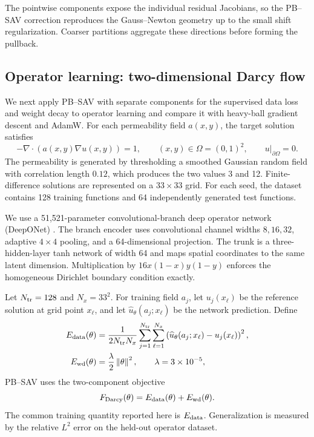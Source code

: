 The pointwise components expose the individual residual Jacobians, so the
PB--SAV correction reproduces the Gauss--Newton geometry up to the small shift
regularization. Coarser partitions aggregate these directions before forming
the pullback.

\subsection{Operator learning: two-dimensional Darcy flow}
\label{sec:darcy-experiment}

We next apply PB--SAV with separate components for the supervised data loss
and weight decay to operator learning and compare it with heavy-ball gradient descent and
AdamW. For each
permeability field \(a(x,y)\), the target solution satisfies
\begin{equation}
  -\nabla\!\cdot\!\left(a(x,y)\nabla u(x,y)\right)=1,
  \qquad (x,y)\in\Omega=(0,1)^2,
  \qquad u|_{\partial\Omega}=0.
  \label{eq:darcy-problem}
\end{equation}
The permeability is generated by thresholding a smoothed Gaussian random
field with correlation length \(0.12\), which produces the two values 3 and
12.  Finite-difference solutions are represented on a \(33\times33\) grid.
For each seed, the dataset contains 128 training functions and 64 independently
generated test functions.

We use a 51,521-parameter convolutional-branch deep operator network
(DeepONet) \cite{lu2021deeponet}. The branch encoder uses convolutional channel widths
\(8,16,32\), adaptive \(4\times4\) pooling, and a 64-dimensional projection.
The trunk is a three-hidden-layer tanh network of width 64 and maps spatial
coordinates to the same latent dimension.  Multiplication by
\(16x(1-x)y(1-y)\) enforces the homogeneous Dirichlet boundary condition exactly.

Let \(N_{\rm tr}=128\) and \(N_x=33^2\).  For training field \(a_j\), let
\(u_j(x_\ell)\) be the reference solution at grid point \(x_\ell\), and let
\(\widehat u_\theta(a_j;x_\ell)\) be the network prediction.  Define
\begin{align}
  E_{\rm data}(\theta)
  &=\frac{1}{2N_{\rm tr}N_x}
    \sum_{j=1}^{N_{\rm tr}}
    \sum_{\ell=1}^{N_x}
    \left(\widehat u_\theta(a_j;x_\ell)-u_j(x_\ell)\right)^2,\\
  E_{\rm wd}(\theta)
  &=\frac{\lambda}{2}\left\lVert\theta\right\rVert^2,
  \qquad \lambda=3\times10^{-5},
\end{align}
PB--SAV uses the two-component objective
\begin{equation}
  F_{\rm Darcy}(\theta)=E_{\rm data}(\theta)+E_{\rm wd}(\theta).
  \label{eq:darcy-objective}
\end{equation}
The common training quantity reported here is \(E_{\rm data}\).
Generalization is measured by the relative \(L^2\) error on the held-out
operator dataset.

